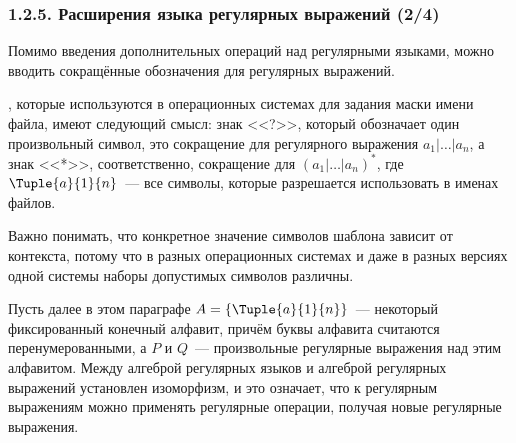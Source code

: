 \begin{frame}
\frametitle{1.2.5. Расширения языка регулярных выражений (2/4)}

Помимо введения дополнительных операций над регулярными языками, 
можно вводить сокращённые обозначения для регулярных выражений.

\begin{example}
, которые используются в операционных
системах для задания маски имени файла, имеют следующий смысл:
знак <<?>>, который обозначает один произвольный символ, это сокращение
для регулярного выражения $a_1 | \dots | a_n$,
а знак <<*>>, соответственно, сокращение для
$(a_1 | \dots | a_n)^*$, где
$\Tuple{a}{1}{n}$~--- все символы, которые разрешается использовать
в именах файлов.
\end{example}

\begin{remark}
Важно понимать, что конкретное значение
символов шаблона зависит от контекста,
потому что в разных операционных системах и даже
в разных версиях одной системы наборы допустимых символов различны.
\end{remark}

\smallskip
Пусть далее в этом параграфе $A=\{\Tuple{a}{1}{n}\}$~--- некоторый фиксированный конечный алфавит, причём буквы 
алфавита считаются перенумерованными, а $P$ и $Q$~--- произвольные регулярные 
выражения над этим алфавитом. Между алгеброй регулярных языков и алгеброй 
регулярных выражений установлен изоморфизм, и это означает, что к регулярным выражениям можно применять регулярные операции, получая новые регулярные выражения.        

\end{frame}



